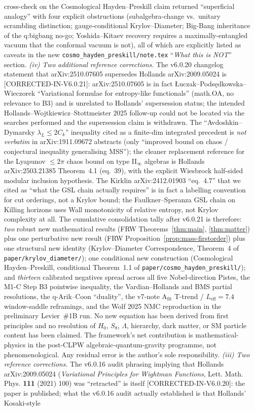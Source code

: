 \documentclass[reprint,amsmath,amssymb,aps,prd,superscriptaddress]{revtex4-2}
\providecommand{\1}{\mathbf{1}}
\begin{document}
cross-check on the Cosmological Hayden--Preskill claim returned ``superficial analogy'' with four explicit obstructions (subalgebra-change vs.\ unitary scrambling distinction; gauge-conditional Krylov--Diameter; Big-Bang inheritance of the q:bigbang no-go; Yoshida--Kitaev recovery requires a maximally-entangled vacuum that the conformal vacuum is not), all of which are explicitly listed as caveats in the new \texttt{cosmo\_hayden\_preskill/note.tex} ``\emph{What this is NOT}'' section. \emph{(iv) Two additional reference corrections.} The v6.0.20 changelog statement that arXiv:2510.07605 supersedes Hollands arXiv:2009.05024 is [CORRECTED-IN-V6.0.21]: arXiv:2510.07605 is in fact \L uczak--Pods\k{e}dkowska--Wieczorek ``Variational formulae for entropy-like functionals'' (math.OA, no relevance to B3) and is unrelated to Hollands' supersession status; the intended Hollands--Wojtkiewicz--Stottmeister 2025 follow-up could not be located via the searches performed and the supersession claim is withdrawn. The ``Avdoshkin--Dymarsky $\lambda_L \le 2 C_k$'' inequality cited as a finite-dim integrated precedent is \emph{not verbatim} in arXiv:1911.09672 abstracts (only ``improved bound on chaos / conjectural inequality generalising MSS''); the cleaner replacement reference for the Lyapunov $\le 2\pi$ chaos bound on type II$_\infty$ algebras is Hollands arXiv:2503.21385 Theorem~4.1 (eq.~39), with the explicit Wiesbrock half-sided modular inclusion hypothesis. The Kirklin arXiv:2412.01903 ``eq.~4.7'' that we cited as ``what the GSL chain actually requires'' is in fact a labelling convention for cut orderings, not a Krylov bound; the Faulkner--Speranza GSL chain on Killing horizons uses Wall monotonicity of relative entropy, not Krylov complexity at all. The cumulative consolidation tally after v6.0.21 is therefore: \emph{two} robust new mathematical results (FRW Theorems~\ref{thm:main}, \ref{thm:matter}) plus one perturbative new result (FRW Proposition~\ref{prop:mass-firstorder}) plus one structural new identity (Krylov--Diameter Correspondence, Theorem~4 of \texttt{paper/krylov\_diameter/}); one conditional new construction (Cosmological Hayden--Preskill, conditional Theorem~1.1 of \texttt{paper/cosmo\_hayden\_preskill/}); and \emph{thirteen} calibrated negatives spread across all five Nobel-direction Pistes, the M1-C Step B3 pointwise inequality, the Vardian--Hollands and BMS partial resolutions, the q-Arik--Coon ``duality'', the v7-note A$_\mathrm{fit}$ T-trend / $L_\mathrm{eff}=7.4$ window-saddle reframings, and the Wolf 2025 NMC reproduction in the preliminary Levier~\#1B run. No new equation has been derived from first principles and no resolution of $H_0$, $S_8$, $\Lambda$, hierarchy, dark matter, or SM particle content has been claimed. The framework's net contribution is mathematical-physics in the post-CLPW algebraic-quantum-gravity programme, not phenomenological. Any residual error is the author's sole responsibility. \emph{(iii) Two reference corrections.} The v6.0.16 audit phrasing implying that Hollands arXiv:2009.05024 (\emph{Variational Principles for Wightman Functions}, Lett. Math. Phys. \textbf{111} (2021) 100) was ``retracted'' is itself [CORRECTED-IN-V6.0.20]: the paper is published; what the v6.0.16 audit actually established is that Hollands' Kosaki-style 
\end{document}
